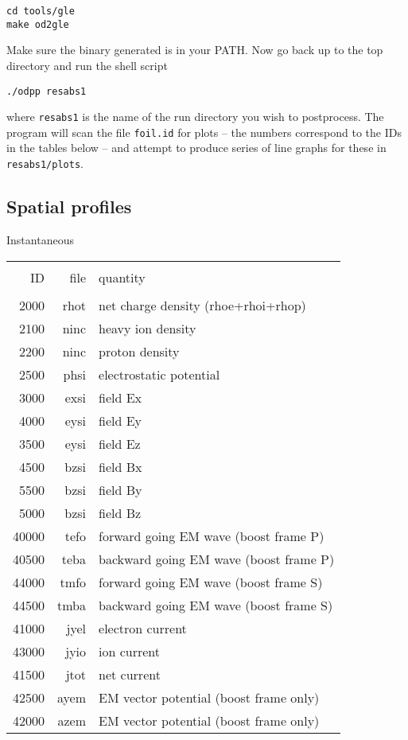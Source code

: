 \documentclass[11pt]{article}
\begin{document}
\begin{verbatim}
cd tools/gle
make od2gle
\end{verbatim}

Make sure the binary generated is in your PATH.  Now go back up to the top directory and run the shell script
\begin{verbatim}
./odpp resabs1
\end{verbatim}
\noindent where \texttt{resabs1} is the name of the run directory you wish to postprocess. The program will scan the file \texttt{foil.id} for plots -- the numbers correspond to the IDs in the tables below -- and attempt to produce series of line graphs for these in \texttt{resabs1/plots}.


\subsection{Spatial profiles} 
 
\noindent Instantaneous\\

\begin{tabular}{rrl}
\hline\\
ID & file & quantity \\
\hline\\
2000 & rhot& net charge density (rhoe+rhoi+rhop) \\ 
2100 & ninc&heavy ion density \\
2200 & ninc&proton density \\
2500 & phsi& electrostatic potential \\
3000 & exsi& field Ex \\
4000 & eysi& field Ey \\
3500 & eysi& field Ez \\
4500 & bzsi& field Bx \\
5500 & bzsi& field By \\
5000 & bzsi& field Bz \\
40000 & tefo& forward going EM wave (boost frame P) \\
40500 & teba& backward going EM wave (boost frame P) \\
44000 & tmfo& forward going EM wave (boost frame S) \\
44500 & tmba& backward going EM wave (boost frame S) \\
41000 & jyel& electron current \\
43000 & jyio& ion current \\
41500 & jtot& net current \\
42500 & ayem& EM vector potential (boost frame only) \\
42000 & azem& EM vector potential (boost frame only) \\
\end{tabular}
\end{document}
